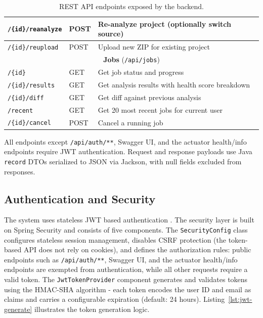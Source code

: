 \begin{table}[htbp]
\begin{tabular}{|l|l|p{6cm}|}
        \texttt{/\{id\}/reanalyze} & POST            & Re-analyze project (optionally switch source)    \\
        \hline
        \texttt{/\{id\}/reupload}  & POST            & Upload new ZIP for existing project              \\
        \hline\hline
        \multicolumn{3}{|c|}{\textbf{Jobs} (\texttt{/api/jobs})} \\
        \hline
        \texttt{/\{id\}}           & GET             & Get job status and progress                      \\
        \hline
        \texttt{/\{id\}/results}   & GET             & Get analysis results with health score breakdown \\
        \hline
        \texttt{/\{id\}/diff}      & GET             & Get diff against previous analysis               \\
        \hline
        \texttt{/recent}           & GET             & Get 20 most recent jobs for current user         \\
        \hline
        \texttt{/\{id\}/cancel}    & POST            & Cancel a running job                             \\
        \hline
    \end{tabular}
    \caption{REST API endpoints exposed by the backend.}
    \label{tab:api-endpoints}
\end{table}

All endpoints except \texttt{/api/auth/**}, Swagger UI, and the actuator health/info endpoints require JWT authentication. Request and response payloads use Java \texttt{record} DTOs serialized to JSON via Jackson, with null fields excluded from responses.

\subsection{Authentication and Security}
\label{subsec:auth-security}

 \par The system uses stateless JWT based authentication \cite{RFC7519}. The security layer is built on Spring Security and consists of five components. The \texttt{SecurityConfig} class configures stateless session management, disables CSRF protection (the token-based API does not rely on cookies), and defines the authorization rules: public endpoints such as \texttt{/api/auth/**}, Swagger UI, and the actuator health/info endpoints are exempted from authentication, while all other requests require a valid token. The \texttt{JwtTokenProvider} component generates and validates tokens using the HMAC-SHA algorithm \cite{RFC4634} - each token encodes the user ID and email as claims and carries a configurable expiration (default: 24 hours). Listing~\ref{lst:jwt-generate} illustrates the token generation logic.

